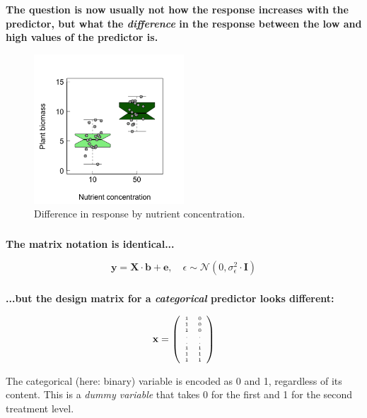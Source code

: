 \documentclass{beamer}
\begin{document}
\begin{frame}
  \frametitle{}
  \textbf{The question is now usually not how the response increases with the predictor, but what the \textit{difference} in the response between the low and high values of the predictor is.}
  
  \begin{figure}[h]
    \centering
    \includegraphics[width=0.5\textwidth]{lectures/day_3_LM_refresh_II/figures/unnamed-chunk-9-1.png} 
    \caption{Difference in response by nutrient concentration.}
  \end{figure}
\end{frame}

\begin{frame}
  \frametitle{}
  \textbf{The matrix notation is identical...}

  \begin{equation*}
  \mathbf{y} = \mathbf{X} \cdot \mathbf{b} + \mathbf{e}, \quad \epsilon \sim \mathcal{N}(0, \sigma^2_{\epsilon} \cdot \mathbf{I})
  \end{equation*}
\end{frame}

\begin{frame}
  \frametitle{}
  \textbf{...but the design matrix for a \textit{categorical} predictor looks different:}

  \begin{equation*}
  \tiny {\mathbf{x} = \left( \begin{array}{cc} 1 & 0 \\ 1 & 0 \\ 1 & 0 \\ . & . \\ . & . \\ 1 & 1 \\ 1 & 1 \\ 1 & 1 \end{array}\right) }
  \end{equation*}
  
  The categorical (here: binary) variable is encoded as 0 and 1, regardless of its content. This is a \textit{dummy variable} that takes 0 for the first and 1 for the second treatment level.
\end{frame}
\end{document}
